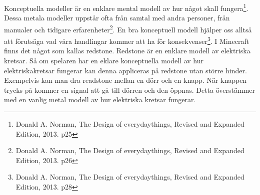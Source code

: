Konceptuella modeller är en enklare mental modell av hur något skall fungera\footnote{Donald A. Norman, The Design of everydaythings, Revised and Expanded Edition, 2013. p25}.
Dessa metala modeller uppstår ofta från samtal med andra personer, från manualer och tidigare erfarenheter\footnote{Donald A. Norman, The Design of everydaythings, Revised and Expanded Edition, 2013. p26}.
En bra konceptuell modell hjälper oss alltså att förutsäga vad våra handlingar kommer att ha för konsekvenser\footnote{Donald A. Norman, The Design of everydaythings, Revised and Expanded Edition, 2013. p28}.
I Minecraft finns det något som kallas redstone. Redstone är en enklare modell av elektriska kretsar. Så om spelaren
har en eklare konceptuella modell av hur elektriskakretsar fungerar kan denna appliceras på redstone utan större hinder. Exempelvis kan man
dra readstone mellan en dörr och en knapp. När knappen trycks på kommer en signal att gå till dörren och den öppnas. Detta överstämmer med 
en vanlig metal modell av hur elektriska kretsar fungerar. 